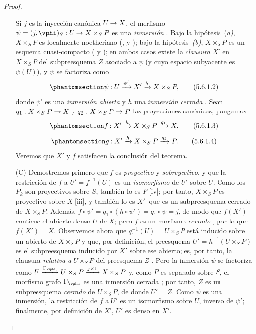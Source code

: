 \documentclass[oneside,10pt]{amsart}
\makeatletter
\newcommand{\ega@arrow}[2]{\mathchoice{#1}{#2}{#2}{#2}}
\renewcommand{\to}{\ega@arrow{\longrightarrow}{\rightarrow}}
\newcommand{\oldpage}[2][]{\marginnote{\normalfont\footnotesize\textbf{#1}~|~#2}\ignorespaces}
\let\EGAOriginalLabel\label
\renewcommand{\label}[1]{\phantomsection\EGAOriginalLabel{#1}}
\makeatother
\begin{document}
\begin{proof}
\begin{enumerate}
    Si $j$ es la inyección canónica $U\to X$, el morfismo $\psi=(j,\vphi)_S:U\to X\times_S P$ es una \emph{inmersión} .
    Bajo la hipótesis~(\emph{a)}, $X\times_S P$ es localmente noetheriano (,  y );
    bajo la hipótesis~\emph{(b)}, $X\times_S P$ es un esquema cuasi-compacto ( y );
    en ambos casos existe la \emph{clausura} $X'$ en $X\times_S P$ del subpreesquema $Z$ asociado a $\psi$ (y cuyo espacio subyacente es $\psi(U)$), y $\psi$ se factoriza como
    \[
    \label{II.5.6.1.2}
      \psi:U\xrightarrow{\psi'}X'\xrightarrow{h}X\times_S P,
      \tag{5.6.1.2}
    \]
    donde $\psi'$ es una \emph{inmersión abierta} y $h$ una \emph{inmersión cerrada} .
    Sean $q_1:X\times_S P\to X$ y $q_2:X\times_S P\to P$ las proyecciones canónicas; pongamos
    \[
    \label{II.5.6.1.3}
      f:X'\xrightarrow{h}X\times_S P\xrightarrow{q_1}X,
      \tag{5.6.1.3}
    \]
    \[
    \label{II.5.6.1.4}
      g:X'\xrightarrow{h}X\times_S P\xrightarrow{q_2}P.
      \tag{5.6.1.4}
    \]
    Veremos que $X'$ y $f$ satisfacen la conclusión del teorema.

  \item[(C)] Demostremos primero que $f$ es \emph{proyectivo} y \emph{sobreyectivo}, y que la restricción de $f$ a $U'=f^{-1}(U)$ es un \emph{isomorfismo} de $U'$ sobre $U$.
    Como los $P_k$ son proyectivos sobre $S$, también lo es $P$ [iv]; por tanto, $X\times_S P$ es proyectivo sobre $X$ [iii], y también lo es $X'$, que es un subpreesquema cerrado de $X\times_S P$.
    Además, $f\circ\psi'=q_1\circ(h\circ\psi')=q_1\circ\psi=j$, de modo que $f(X')$ contiene el abierto denso $U$ de $X$; pero $f$ es un morfismo \emph{cerrado} , por lo que $f(X')=X$.
    Observemos ahora que $q_1^{-1}(U)=U\times_S P$ está inducido sobre un abierto de $X\times_S P$ y que, por definición, el preesquema $U'=h^{-1}(U\times_S P)$ es el subpreesquema inducido por $X'$ sobre ese abierto; es, por tanto, la clausura \emph{relativa a}
\oldpage[II]{108}
    $U\times_S P$ del preesquema $Z$ .
    Pero la inmersión $\psi$ se factoriza como $U\xrightarrow{\Gamma_\vphi}U\times_S P\xrightarrow{j\times1}X\times_S P$ y, como $P$ es separado sobre $S$, el morfismo grafo $\Gamma_\vphi$ es una inmersión cerrada ; por tanto, $Z$ es un subpreesquema \emph{cerrado} de $U\times_S P$, de donde $U'=Z$.
    Como $\psi$ es una inmersión, la restricción de $f$ a $U'$ es un isomorfismo sobre $U$, inverso de $\psi'$; finalmente, por definición de $X'$, $U'$ es denso en $X'$.


\end{enumerate}
\end{proof}
\end{document}
